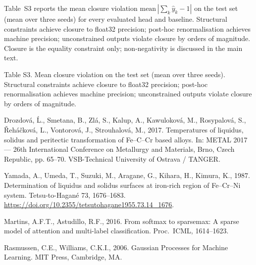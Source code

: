\documentclass[11pt,a4paper]{article}
\begin{document}
Table~S3 reports the mean closure violation
$\mathrm{mean}\,|\sum_k \hat y_k - 1|$ on the test set (mean over three
seeds) for every evaluated head and baseline. Structural constraints
achieve closure to float32 precision; post-hoc renormalisation achieves
machine precision; unconstrained outputs violate closure by orders of
magnitude. Closure is the equality constraint only; non-negativity is
discussed in the main text.

\begin{table}[htbp]
\centering
\caption{Table S3. Mean closure violation on the test set (mean over three
seeds). Structural constraints achieve closure to float32 precision;
post-hoc renormalisation achieves machine precision; unconstrained
outputs violate closure by orders of magnitude.}
\label{tab:si-closure}
\small

\end{table}

\begin{thebibliography}{99}

Drozdov\'a, \'L., Smetana, B., Zl\'a, S., Kalup, A., Kawulokov\'a, M.,
Rosypalov\'a, S., \v{R}eh\'a\v{c}kov\'a, L., Vontorov\'a, J., Strouhalov\'a,
M., 2017. Temperatures of liquidus, solidus and peritectic transformation
of Fe--C--Cr based alloys. In: METAL 2017 --- 26th International
Conference on Metallurgy and Materials, Brno, Czech Republic, pp. 65--70.
VSB-Technical University of Ostrava / TANGER.

Yamada, A., Umeda, T., Suzuki, M., Aragane, G., Kihara, H., Kimura, K.,
1987. Determination of liquidus and solidus surfaces at iron-rich region
of Fe--Cr--Ni system. Tetsu-to-Hagan\'e 73, 1676--1683.
\url{https://doi.org/10.2355/tetsutohagane1955.73.14_1676}.

Martins, A.F.T., Astudillo, R.F., 2016. From softmax to sparsemax: A sparse
model of attention and multi-label classification. Proc.\ ICML, 1614--1623.

Rasmussen, C.E., Williams, C.K.I., 2006. Gaussian Processes for Machine
Learning. MIT Press, Cambridge, MA.

\end{thebibliography}
\end{document}
